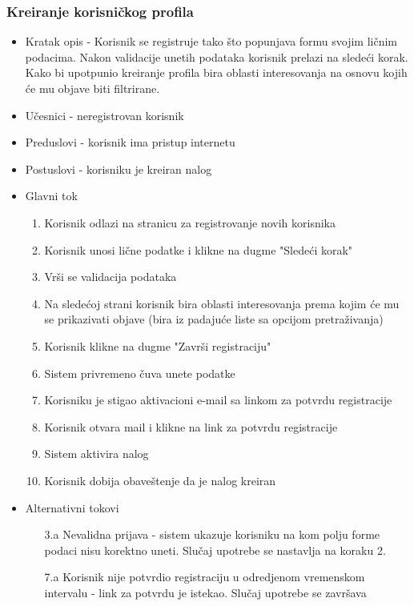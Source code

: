 \subsubsection{Kreiranje korisničkog profila}
\begin{itemize}
\item Kratak opis - Korisnik se registruje tako što popunjava formu svojim ličnim podacima. Nakon validacije unetih podataka korisnik prelazi na sledeći korak. Kako bi upotpunio kreiranje profila bira oblasti interesovanja na osnovu kojih će mu objave biti filtrirane.
\item Učesnici - neregistrovan korisnik
\item Preduslovi - korisnik ima pristup internetu
\item Postuslovi - korisniku je kreiran nalog
\item Glavni tok
	\begin{enumerate}
	\item Korisnik odlazi na stranicu za registrovanje novih korisnika
	\item Korisnik unosi lične podatke i klikne na dugme "Sledeći korak"
	\item Vrši se validacija podataka
	\item Na sledećoj strani korisnik bira oblasti interesovanja prema kojim će mu se prikazivati objave (bira iz padajuće liste sa opcijom pretraživanja)
	\item Korisnik klikne na dugme "Završi registraciju"
	\item Sistem privremeno čuva unete podatke
	\item Korisniku je stigao aktivacioni e-mail sa linkom za potvrdu registracije
	\item Korisnik otvara mail i klikne na link za potvrdu registracije
	\item Sistem aktivira nalog
	\item Korisnik dobija obaveštenje da je nalog kreiran
	\end{enumerate}
\item Alternativni tokovi
	\begin{itemize}
	\item[3.a] Nevalidna prijava - sistem ukazuje korisniku na kom polju forme podaci nisu korektno uneti. Slučaj upotrebe se nastavlja na koraku 2.
	\item[7.a] Korisnik nije potvrdio registraciju u odredjenom vremenskom intervalu - link za potvrdu je istekao. Slučaj upotrebe se završava
	\end{itemize}
\end{itemize}


